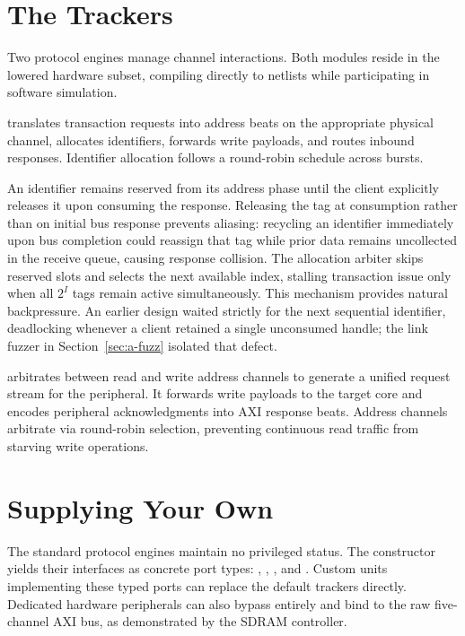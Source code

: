 \documentclass[journal,9pt]{IEEEtran}
\newcommand{\axipart}[3]{%
}
\begin{document}
\section{The Trackers}
\label{sec:a-trackers}

Two protocol engines manage channel interactions. Both modules reside in the
lowered hardware subset, compiling directly to netlists while participating
in software simulation.

 translates transaction requests into address beats on the
appropriate physical channel, allocates identifiers, forwards write
payloads, and routes inbound responses. Identifier allocation follows a
round-robin schedule across bursts.

\axipart{hostunit}{\code{AxiHost}: host-side hardware protocol engine.}{lst:a-hostunit}

An identifier remains reserved from its address phase until the client
explicitly releases it upon consuming the response. Releasing the tag at
consumption rather than on initial bus response prevents aliasing: recycling
an identifier immediately upon bus completion could reassign that tag while
prior data remains uncollected in the receive queue, causing response
collision. The allocation arbiter skips reserved slots and selects the next
available index, stalling transaction issue only when all \(2^I\) tags
remain active simultaneously. This mechanism provides natural backpressure.
An earlier design waited strictly for the next sequential identifier,
deadlocking whenever a client retained a single unconsumed handle; the link
fuzzer in Section~\ref{sec:a-fuzz} isolated that defect.

 arbitrates between read and write address channels to generate
a unified request stream for the peripheral. It forwards write payloads to
the target core and encodes peripheral acknowledgments into AXI response
beats. Address channels arbitrate via round-robin selection, preventing
continuous read traffic from starving write operations.

\axipart{perunit}{\code{AxiPer}: peripheral-side hardware protocol engine.}{lst:a-perunit}

\section{Supplying Your Own}
\label{sec:a-own}

The standard protocol engines maintain no privileged status. The
 constructor yields their interfaces as concrete port types:
, , , and . Custom units
implementing these typed ports can replace the default trackers directly.
Dedicated hardware peripherals can also bypass  entirely and
bind to the raw five-channel AXI bus, as demonstrated by the SDRAM
controller.
\end{document}
